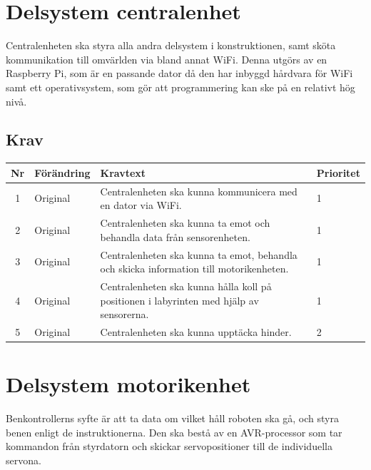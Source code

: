\documentclass[a4paper,titlepage,12pt]{article}
\begin{document}
	\section{Delsystem centralenhet}
	Centralenheten ska styra alla andra delsystem i konstruktionen, samt sköta
	kommunikation till omvärlden via bland annat WiFi. Denna utgörs av en Raspberry
	Pi, som är en passande dator då den har inbyggd hårdvara för WiFi samt
	ett operativsystem, som gör att programmering kan ske på en relativt hög nivå.

	\subsection{Krav}
	\begin{table}[h]
		\label{tab:label}
		\begin{tabularx}{\textwidth}{|c|l|X|l|}
			\hline
			\textbf{Nr} & \textbf{Förändring} & \textbf{Kravtext} & \textbf{Prioritet} 
				\\ \hline

			1 & Original & Centralenheten ska kunna kommunicera med en dator via WiFi. & 1
				\\ \hline

			2 & Original & Centralenheten ska kunna ta emot och behandla data från sensorenheten.& 1
				\\ \hline

			3 & Original & Centralenheten ska kunna ta emot, behandla och skicka information 
				till motorikenheten. & 1
				\\ \hline

			4 & Original & Centralenheten ska kunna hålla koll på positionen i labyrinten 
				med hjälp av sensorerna. & 1
				\\ \hline

            5 & Original & Centralenheten ska kunna upptäcka hinder. & 2

		\end{tabularx}
	\end{table}




	\section{Delsystem motorikenhet}
	Benkontrollerns syfte är att ta data om vilket håll roboten ska gå, och styra benen enligt de
	instruktionerna. Den ska bestå av en AVR-processor som tar kommandon från styrdatorn och skickar
	servopositioner till de individuella servona.
\end{document}
